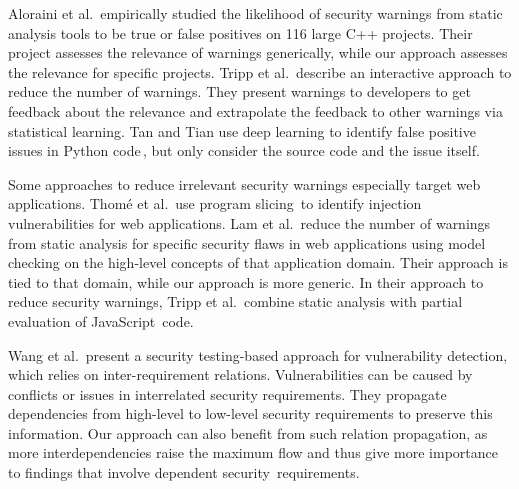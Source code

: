 Aloraini et al.\,\cite{Aloraini2019} empirically studied the likelihood of security warnings from static analysis tools to be true or false positives on 116 large C++ projects.
Their project assesses the relevance of warnings generically, while our approach assesses the relevance for specific projects. Tripp et al.\,\cite{Tripp2014} describe an interactive approach to reduce the number of warnings. %
They present warnings to developers to get feedback about the relevance and extrapolate the feedback to other warnings via statistical learning.
Tan and Tian use deep learning to identify false positive issues in Python code\,\cite{app14135542}, but only consider the source code and the issue itself.

Some approaches to reduce irrelevant security warnings especially target web applications. Thom{\'e} et al.\,\cite{Thome2018} use program slicing\,\cite{Weiser1981} to identify injection vulnerabilities for web applications.
Lam et al.\,\cite{Lam2008} reduce the number of warnings from static analysis for specific security flaws in web applications using model checking on the high-level concepts of that application domain. Their approach is tied to that domain, while our approach is %
more generic. In their approach to reduce %
security warnings, Tripp et al.\,\cite{Tripp2014a} combine static analysis with partial evaluation of JavaScript~code.

Wang et al.\,\cite{Wang2020DSS} present a security testing-based approach for vulnerability detection, which relies on inter-requirement relations. Vulnerabilities can be caused by conflicts or issues in interrelated security requirements.
They propagate dependencies from high-level to low-level security requirements to preserve this information.
Our approach can also benefit from such relation propagation, as more interdependencies raise the maximum flow and thus give more importance to findings that involve dependent security~requirements.

